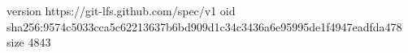 version https://git-lfs.github.com/spec/v1
oid sha256:9574c5033cca5c62213637b6bd909d1c34c3436a6e95995de1f4947eadfda478
size 4843
